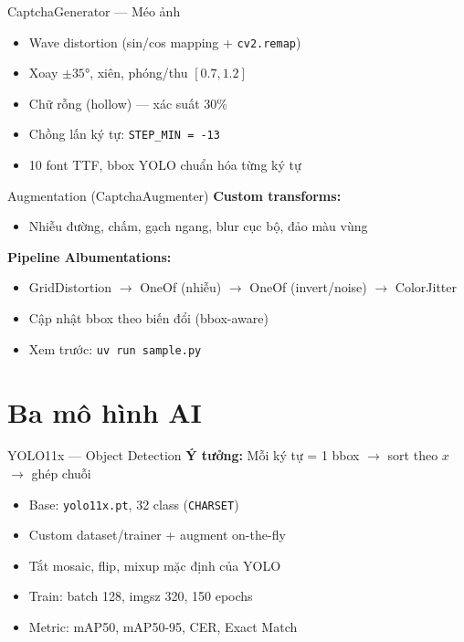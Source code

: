 \documentclass[aspectratio=169,12pt]{beamer}
\begin{document}
\begin{frame}{CaptchaGenerator --- Méo ảnh}
  \begin{itemize}
    \item Wave distortion (sin/cos mapping + \texttt{cv2.remap})
    \item Xoay $\pm 35°$, xiên, phóng/thu $[0.7, 1.2]$
    \item Chữ rỗng (hollow) --- xác suất 30\%
    \item Chồng lấn ký tự: \texttt{STEP\_MIN = -13}
    \item 10 font TTF, bbox YOLO chuẩn hóa từng ký tự
  \end{itemize}
\end{frame}

\begin{frame}{Augmentation (CaptchaAugmenter)}
  \textbf{Custom transforms:}
  \begin{itemize}
    \item Nhiễu đường, chấm, gạch ngang, blur cục bộ, đảo màu vùng
  \end{itemize}

  \textbf{Pipeline Albumentations:}
  \begin{itemize}
    \item GridDistortion $\rightarrow$ OneOf (nhiễu) $\rightarrow$ OneOf (invert/noise) $\rightarrow$ ColorJitter
    \item Cập nhật bbox theo biến đổi (bbox-aware)
    \item Xem trước: \texttt{uv run sample.py}
  \end{itemize}
\end{frame}

\section{Ba mô hình AI}

\begin{frame}{YOLO11x --- Object Detection}
  \textbf{Ý tưởng:} Mỗi ký tự = 1 bbox $\rightarrow$ sort theo $x$ $\rightarrow$ ghép chuỗi

  \vspace{0.3cm}
  \begin{itemize}
    \item Base: \texttt{yolo11x.pt}, 32 class (\texttt{CHARSET})
    \item Custom dataset/trainer + augment on-the-fly
    \item Tắt mosaic, flip, mixup mặc định của YOLO
    \item Train: batch 128, imgsz 320, 150 epochs
    \item Metric: mAP50, mAP50-95, CER, Exact Match
  \end{itemize}
\end{frame}
\end{document}
